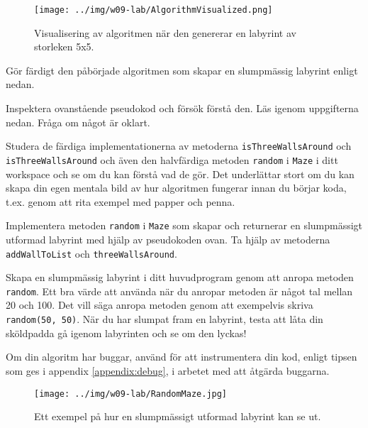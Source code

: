 \begin{figure}[H]
	\begin{center}
		\texttt{[image: ../img/w09-lab/AlgorithmVisualized.png]}
	\end{center}
	\caption{Visualisering av algoritmen när den genererar en labyrint av storleken 5x5.}
	\label{lab:maze:prims-algo-viz}
\end{figure}


\Task Gör färdigt den påbörjade algoritmen som skapar en slumpmässig labyrint enligt nedan.

\Subtask Inspektera ovanstående pseudokod och försök förstå den. Läs igenom uppgifterna nedan. Fråga om något är oklart. 

\Subtask Studera de färdiga implementationerna av metoderna \texttt{isThreeWallsAround} och \texttt{isThreeWallsAround} och även den halvfärdiga metoden \texttt{random} i \texttt{Maze} i ditt workspace och se om du kan förstå vad de gör. Det underlättar stort om du kan skapa din egen mentala bild av hur algoritmen fungerar innan du börjar koda, t.ex. genom att rita exempel med papper och penna.

\Subtask Implementera metoden \texttt{random} i \texttt{Maze} som skapar och returnerar en slumpmässigt utformad labyrint med hjälp av pseudokoden ovan. Ta hjälp av metoderna \texttt{addWallToList} och \texttt{threeWallsAround}.

\Subtask Skapa en slumpmässig labyrint i ditt huvudprogram genom att anropa metoden \texttt{random}. Ett bra värde att använda när du anropar metoden är något tal mellan 20 och 100. Det vill säga anropa metoden genom att exempelvis skriva \texttt{random(50, 50)}. När du har slumpat fram en labyrint, testa att låta din sköldpadda gå igenom labyrinten och se om den lyckas!

\Subtask Om din algoritm har buggar, använd  för att instrumentera din kod, enligt tipsen som ges i appendix \ref{appendix:debug}, i arbetet med att åtgärda buggarna.

\begin{figure}[h]
	\begin{center}
		\texttt{[image: ../img/w09-lab/RandomMaze.jpg]}
	\end{center}
	\caption{Ett exempel på hur en slumpmässigt utformad labyrint kan se ut.}
\end{figure}

